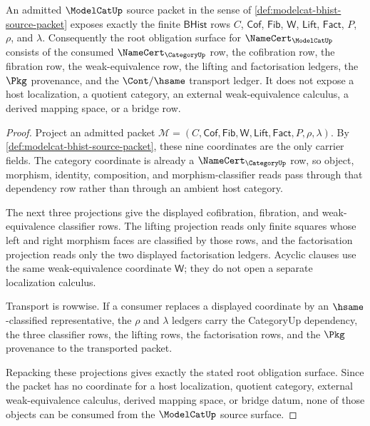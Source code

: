 \begin{theorem}
\label{thm:modelcat-root-obligation-surface}
An admitted $\ModelCatUp$ source packet in the sense of
\autoref{def:modelcat-bhist-source-packet} exposes exactly the finite
$\mathsf{BHist}$ rows $C$, $\mathsf{Cof}$, $\mathsf{Fib}$, $\mathsf{W}$,
$\mathsf{Lift}$, $\mathsf{Fact}$, $P$, $\rho$, and $\lambda$. Consequently the
root obligation surface for $\NameCert_{\ModelCatUp}$ consists of the consumed
$\NameCert_{\CategoryUp}$ row, the cofibration row, the fibration row, the
weak-equivalence row, the lifting and factorisation ledgers, the $\Pkg$
provenance, and the $\Cont/\hsame$ transport ledger. It does not expose a host
localization, a quotient category, an external weak-equivalence calculus, a
derived mapping space, or a bridge row.
\end{theorem}
\begin{proof}
Project an admitted packet
$\mathcal{M}=(C,\mathsf{Cof},\mathsf{Fib},\mathsf{W},\mathsf{Lift},\mathsf{Fact},P,\rho,\lambda)$.
By \autoref{def:modelcat-bhist-source-packet}, these nine coordinates are the
only carrier fields. The category coordinate is already a
$\NameCert_{\CategoryUp}$ row, so object, morphism, identity, composition, and
morphism-classifier reads pass through that dependency row rather than through
an ambient host category.

The next three projections give the displayed cofibration, fibration, and
weak-equivalence classifier rows. The lifting projection reads only finite
squares whose left and right morphism faces are classified by those rows, and
the factorisation projection reads only the two displayed factorisation
ledgers. Acyclic clauses use the same weak-equivalence coordinate
$\mathsf{W}$; they do not open a separate localization calculus.

Transport is rowwise. If a consumer replaces a displayed coordinate by an
$\hsame$-classified representative, the $\rho$ and $\lambda$ ledgers carry the
CategoryUp dependency, the three classifier rows, the lifting rows, the
factorisation rows, and the $\Pkg$ provenance to the transported packet.

Repacking these projections gives exactly the stated root obligation surface.
Since the packet has no coordinate for a host localization, quotient category,
external weak-equivalence calculus, derived mapping space, or bridge datum,
none of those objects can be consumed from the $\ModelCatUp$ source surface.
\end{proof}

